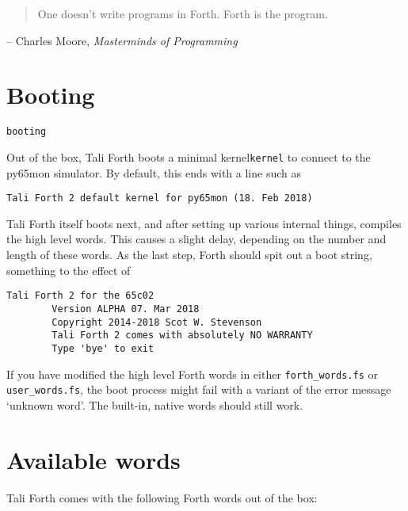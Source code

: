 
\begin{quote}
	One doesn't write programs in Forth. Forth is the program.
\end{quote}
\begin{flushright}
        -- Charles Moore, \textit{Masterminds of Programming}\cite{biancuzzi09}
\end{flushright}

\section{Booting}\texttt{booting}

Out of the box, Tali Forth boots a minimal kernel\texttt{kernel}
to connect to the py65mon simulator. By default, this ends with a
line such as

\begin{lstlisting}[frame=lines]
        Tali Forth 2 default kernel for py65mon (18. Feb 2018)
\end{lstlisting}

\noindent Tali Forth itself boots next, and after setting up various internal
things, compiles the high level words. This causes a slight delay, depending on
the number and length of these words. As the last step, Forth should spit out a
boot string, something to the effect of

\begin{lstlisting}[frame=lines]
        Tali Forth 2 for the 65c02
        Version ALPHA 07. Mar 2018 
        Copyright 2014-2018 Scot W. Stevenson
        Tali Forth 2 comes with absolutely NO WARRANTY
        Type 'bye' to exit
\end{lstlisting}

\noindent If you have modified the high level Forth words in
either \texttt{forth\_words.fs} or \texttt{user\_words.fs}, the boot process might
fail with a variant of the error message `unknown word'. The built-in, native
words should still work.

\section{Available words}

Tali Forth comes with the following Forth words out of the
box:

